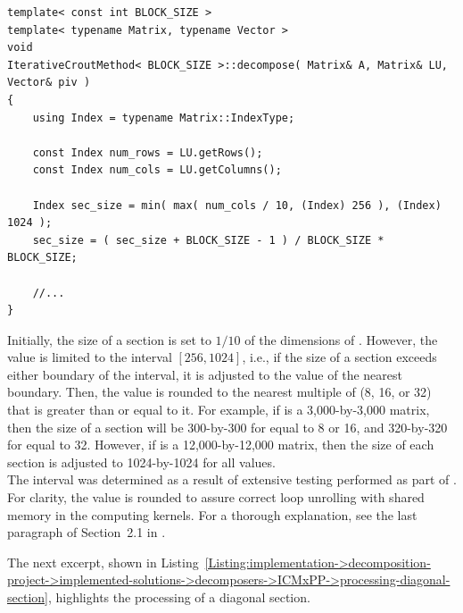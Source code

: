 \begin{lstlisting}[caption={An excerpt from the definition of the overloaded \code{decompose()} method for the ICM\_\textit{x}PP decomposer.
This definition matches the declaration shown in Listing~\ref{Listing:implementation->decomposition-project->implemented-solutions->decomposers->ICMxPP->method-declaration-initial-estimate}.
The \code{Index} type and dimension-representing variables are included for clarity.
The template parameter \code{BLOCK\_SIZE}, equivalent to \textit{x} in ICM\_\textit{x}PP, represents the number of threads in the 1st and 2nd dimensions of a CUDA thread block.},label={Listing:implementation->decomposition-project->implemented-solutions->decomposers->ICMxPP->size-of-sections}]
template< const int BLOCK_SIZE >
template< typename Matrix, typename Vector >
void
IterativeCroutMethod< BLOCK_SIZE >::decompose( Matrix& A, Matrix& LU, Vector& piv )
{
	using Index = typename Matrix::IndexType;
	
	const Index num_rows = LU.getRows();
	const Index num_cols = LU.getColumns();
	
	Index sec_size = min( max( num_cols / 10, (Index) 256 ), (Index) 1024 );
	sec_size = ( sec_size + BLOCK_SIZE - 1 ) / BLOCK_SIZE * BLOCK_SIZE;
	
	//...
}
\end{lstlisting}

Initially, the size of a section is set to $1/10$ of the dimensions of .
However, the value is limited to the interval $\left[256, 1024\right]$, i.e., if the size of a section exceeds either boundary of the interval, it is adjusted to the value of the nearest boundary.
Then, the value is rounded to the nearest multiple of  (8, 16, or 32) that is greater than or equal to it.
For example, if  is a 3,000-by-3,000 matrix, then the size of a section will be 300-by-300 for  equal to 8 or 16, and 320-by-320 for  equal to 32.
However, if  is a 12,000-by-12,000 matrix, then the size of each section is adjusted to 1024-by-1024 for all  values.\\
The interval was determined as a result of extensive testing performed as part of  \cite{Cejka2022}.
For clarity, the value is rounded to assure correct loop unrolling with shared memory in the computing kernels.
For a thorough explanation, see the last paragraph of Section~2.1 in  \cite{Cejka2022}.

The next excerpt, shown in Listing~\ref{Listing:implementation->decomposition-project->implemented-solutions->decomposers->ICMxPP->processing-diagonal-section}, highlights the processing of a diagonal section.

